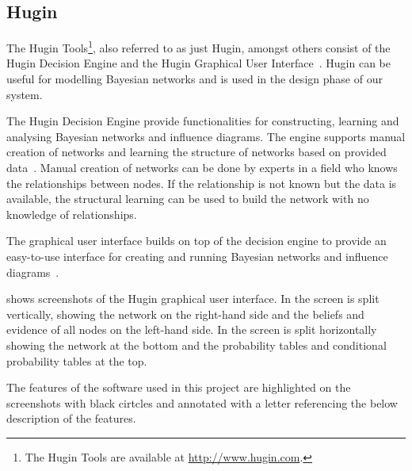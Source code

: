 \subsection{Hugin}
\label{sec:analysis:bayesian-network:hugin}

The Hugin Tools\footnote{The Hugin Tools are available at \url{http://www.hugin.com}.}, also referred to as just Hugin, amongst others consist of the Hugin Decision Engine and the Hugin Graphical User Interface~\cite{jensen2005hugin}. Hugin can be useful for modelling Bayesian networks and is used in the design phase of our system.

The Hugin Decision Engine provide functionalities for constructing, learning and analysing Bayesian networks and influence diagrams. The engine supports manual creation of networks and learning the structure of networks based on provided data~\cite{jensen2005hugin}. Manual creation of networks can be done by experts in a field who knows the relationships between nodes. If the relationship is not known but the data is available, the structural learning can be used to build the network with no knowledge of relationships.

The graphical user interface builds on top of the decision engine to provide an easy-to-use interface for creating and running Bayesian networks and influence diagrams~\cite{jensen2005hugin}.

 shows screenshots of the Hugin graphical user interface.
In  the screen is split vertically, showing the network on the right-hand side and the beliefs and evidence of all nodes on the left-hand side. In  the screen is split horizontally showing the network at the bottom and the probability tables and conditional probability tables at the top.

The features of the software used in this project are highlighted on the screenshots with black cirtcles and annotated with a letter referencing the below description of the features.

